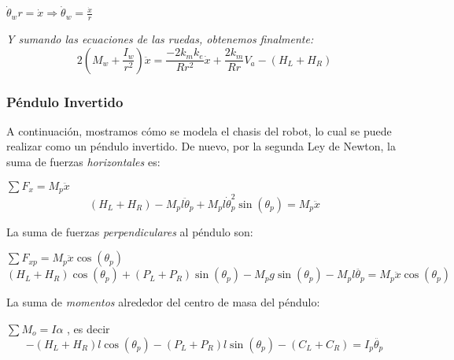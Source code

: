\documentclass[10pt]{article}
\begin{document}
\vspace{2 mm}

$\dot{\theta}_{w}r = \dot{x} \Rightarrow \dot{\theta}_{w} = \frac{\dot{x}}{r}$

\vspace{2 mm}
\emph{Y sumando las ecuaciones de las ruedas, obtenemos finalmente:}
\vspace{2 mm}
\begin{equation} 
2(M_{w} + \frac{I_{w}}{r^2})\ddot{x} = \frac{-2k_{m}k_{e}}{Rr^2}\dot{x} + \frac{2k_{m}}{Rr}V_{a} - (H_{L} + H_{R})
\end{equation} 
\vspace{2 mm}

\subsubsection{Péndulo Invertido}
A continuación, mostramos cómo se modela el chasis del robot, lo cual se puede realizar como un péndulo invertido.
De nuevo, por la segunda Ley de Newton, la suma de fuerzas \emph{horizontales} es:

\vspace{2 mm}
 $\sum{F_{x}} = M_{p}\ddot{x}$
\vspace{2 mm}
\begin{equation} 
(H_{L} + H_{R}) - M_{p}l\ddot{\theta}_{p} + M_{p}l\dot{\theta}^2_{p}\sin(\theta_{p}) = M_{p}\ddot{x}
\end{equation} 
\vspace{2 mm}

La suma de fuerzas \emph{perpendiculares} al péndulo son:

\vspace{2 mm}
 $\sum{F_{xp}} = M_{p}\ddot{x}\cos(\theta_{p})$
\vspace{2 mm}
\begin{equation} 
(H_{L} + H_{R})\cos(\theta_{p}) + (P_{L} + P_{R})\sin(\theta_{p}) - M_{p}g\sin(\theta_{p}) - M_{p}l\ddot{\theta_{p}} = M_{p}\ddot{x}\cos(\theta_{p})
\end{equation} 
\vspace{2 mm}

La suma de \emph{momentos} alrededor del centro de masa del péndulo:

\vspace{2 mm}
$\sum{M_{o}} = I\alpha$ , es decir
\vspace{2 mm}
\begin{equation} 
-(H_{L} + H_{R})l\cos(\theta_{p}) - (P_{L} + P_{R})l\sin(\theta_{p}) - (C_{L} + C_{R}) = I_{p}\ddot{\theta_{p}}
\end{equation}  
\vspace{2 mm}
\end{document}
